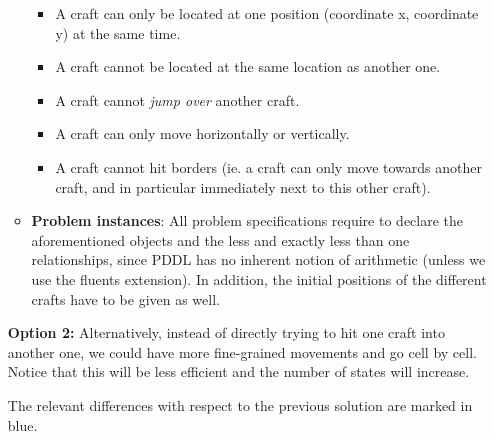 \documentclass{article}
\begin{document}
\begin{enumerate}
\begin{itemize}
        \begin{itemize}
            \item A craft can only be located at one position (coordinate x, coordinate y) at the same time.
            \item A craft cannot be located at the same location as another one.
            \item A craft cannot \textit{jump over} another craft.
            \item A craft can only move horizontally or vertically.
            \item A craft cannot hit borders (ie. a craft can only move towards another craft, and in particular immediately next to this other craft).
        \end{itemize}
    \item \textbf{Problem instances}: All problem specifications require to declare the aforementioned objects and the less and exactly less than one relationships, since PDDL has no inherent notion of arithmetic (unless we use the fluents extension). In addition, the initial positions of the different crafts have to be given as well.
\end{itemize}


\textbf{Option 2:} Alternatively, instead of directly trying to hit one craft into another one, we could have more fine-grained movements and go cell by cell. Notice that this will be less efficient and the number of states will increase.

The relevant differences with respect to the previous solution are marked in blue.


\end{enumerate}
\end{document}
